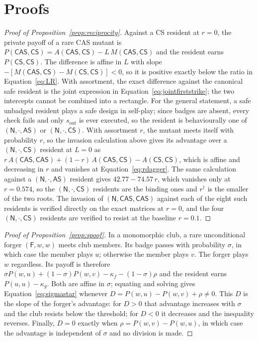 \documentclass[11pt,a4paper]{article}
\theoremstyle{definition}
\newcommand{\AS}{\textsf{AS}}
\newcommand{\CS}{\textsf{CS}}
\newcommand{\CAS}{\textsf{CAS}}
\begin{document}



\appendix

\section{Proofs}
\label{app:proofs}

\begin{proof}[Proof of Proposition~\ref{prop:reciprocity}]
Against a \CS{} resident at $r=0$, the private payoff of a rare \CAS{} mutant is
$P(\CAS, \CS) = A(\CAS, \CS) - L\,M(\CAS, \CS)$ and the resident earns
$P(\CS,\CS)$. The difference is affine in $L$ with slope
$-[M(\CAS,\CS) - M(\CS,\CS)] < 0$, so it is positive exactly below the ratio
in Equation~\eqref{eq:LR}. With assortment, the exact difference against the
canonical safe resident is the joint expression in Equation~\eqref{eq:jointfirststrike};
the two intercepts cannot be combined into a rectangle. For the general statement, a safe unbadged resident
plays a safe design in self-play; since badges are absent, every check fails
and only $s_{\mathrm{out}}$ is ever executed, so the resident is behaviourally
one of $(\mathsf{N}, \cdot, \AS)$ or $(\mathsf{N}, \cdot, \CS)$. With
assortment $r$, the mutant meets itself with probability $r$, so the invasion
calculation above gives its advantage over a $(\mathsf{N},\cdot,\CS)$
resident at $L = 0$ as
$r\,A(\CAS,\CAS) + (1-r)\,A(\CAS,\CS) - A(\CS,\CS)$, which is affine and
decreasing in $r$ and vanishes at Equation~\eqref{eq:rdagger}. The same
calculation against a $(\mathsf{N},\cdot,\AS)$ resident gives
$42.77 - 74.57\,r$, which vanishes only at $r = 0.574$, so the
$(\mathsf{N},\cdot,\CS)$ residents are the binding ones and $r^{\dagger}$ is
the smaller of the two roots. The invasion of $(\mathsf{N}, \CAS, \CAS)$ against
each of the eight such residents is verified directly on the exact matrices at
$r = 0$, and the four $(\mathsf{N}, \cdot, \CS)$ residents are verified to
resist at the baseline $r = 0.1$.
\end{proof}

\begin{proof}[Proof of Proposition~\ref{prop:spoof}]
In a monomorphic club, a rare unconditional forger $(\mathsf{F}, w, w)$ meets
club members. Its badge passes with probability $\sigma$, in which case the
member plays $u$; otherwise the member plays $v$. The forger plays $w$
regardless. Its payoff is therefore
$\sigma P(w, u) + (1-\sigma) P(w, v) - \kappa_f - (1-\sigma)\rho$ and the
resident earns $P(u,u) - \kappa_g$. Both are affine in $\sigma$; equating and
solving gives Equation~\eqref{eq:sigmastar} whenever
$D=P(w,u)-P(w,v)+\rho\neq0$. This $D$ is the slope of the forger's advantage:
for $D>0$ that advantage increases with $\sigma$ and the club resists below the
threshold; for $D<0$ it decreases and the inequality reverses. Finally,
$D=0$ exactly when $\rho=P(w,v)-P(w,u)$, in which case the advantage is
independent of $\sigma$ and no division is made.
\end{proof}
\end{document}
